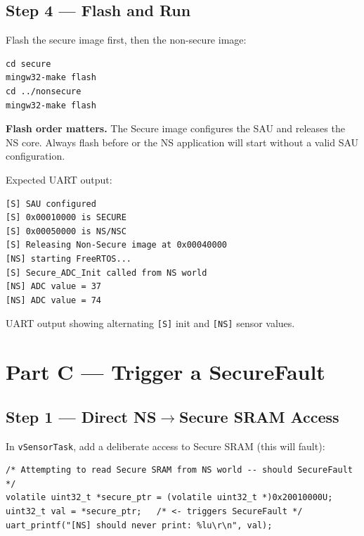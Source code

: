 \documentclass[11pt, a4paper]{article}
\begin{document}
\subsection{Step 4 --- Flash and Run}

Flash the secure image first, then the non-secure image:

\begin{lstlisting}[style=bashstyle]
cd secure
mingw32-make flash
cd ../nonsecure
mingw32-make flash
\end{lstlisting}

\begin{warnbox}
  \textbf{Flash order matters.} The Secure image configures the SAU and releases
  the NS core. Always flash  before  or the NS
  application will start without a valid SAU configuration.
\end{warnbox}

Expected UART output:

\begin{lstlisting}[style=textstyle]
[S] SAU configured
[S] 0x00010000 is SECURE
[S] 0x00050000 is NS/NSC
[S] Releasing Non-Secure image at 0x00040000
[NS] starting FreeRTOS...
[S] Secure_ADC_Init called from NS world
[NS] ADC value = 37
[NS] ADC value = 74
\end{lstlisting}

\begin{checkpointbox}[~B2]
  UART output showing alternating \texttt{[S]} init and \texttt{[NS]} sensor values.
\end{checkpointbox}

\section{Part C --- Trigger a SecureFault}

\subsection{Step 1 --- Direct NS$\to$Secure SRAM Access}

In \texttt{vSensorTask}, add a deliberate access to Secure SRAM (this will fault):

\begin{lstlisting}[style=cstyle]
/* Attempting to read Secure SRAM from NS world -- should SecureFault */
volatile uint32_t *secure_ptr = (volatile uint32_t *)0x20010000U;
uint32_t val = *secure_ptr;   /* <- triggers SecureFault */
uart_printf("[NS] should never print: %lu\r\n", val);
\end{lstlisting}
\end{document}
